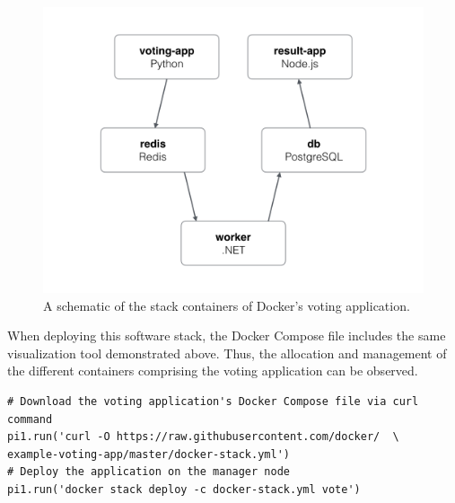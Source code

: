 \documentclass[sigconf]{acmart}
\begin{document}
\begin{figure}[!ht]
  \centering\includegraphics[width=\columnwidth]{images/votingApp.png}
  \caption{A schematic of the stack containers of Docker's voting application.}\label{f:votingApp}
\end{figure}

\setlength{\parskip}{1em}\noindent When deploying this software stack, the Docker Compose file includes the same visualization tool demonstrated above. Thus, the allocation and management of the different containers comprising the voting application can be observed.

\begin{lstlisting}
# Download the voting application's Docker Compose file via curl command
pi1.run('curl -O https://raw.githubusercontent.com/docker/  \
example-voting-app/master/docker-stack.yml')
# Deploy the application on the manager node
pi1.run('docker stack deploy -c docker-stack.yml vote')
\end{lstlisting}
\end{document}
